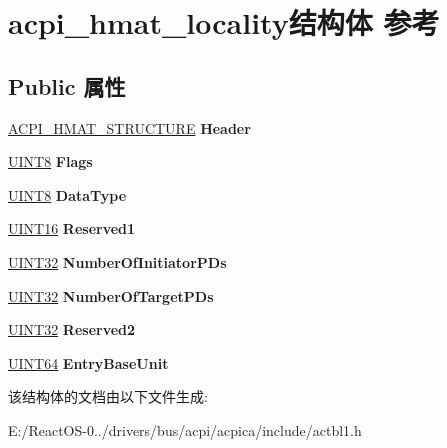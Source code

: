 \hypertarget{structacpi__hmat__locality}{}\section{acpi\+\_\+hmat\+\_\+locality结构体 参考}
\label{structacpi__hmat__locality}
\subsection*{Public 属性}
\begin{DoxyCompactItemize}
\item 
\mbox{\label{structacpi__hmat__locality_a05fea13a2133bc8eba3e2a5760065901}} 
\hyperlink{structacpi__hmat__structure}{A\+C\+P\+I\+\_\+\+H\+M\+A\+T\+\_\+\+S\+T\+R\+U\+C\+T\+U\+RE} {\bfseries Header}
\item 
\mbox{\label{structacpi__hmat__locality_a62192b0485e4403e5d60ae7096cd00b6}} 
\hyperlink{_processor_bind_8h_ab27e9918b538ce9d8ca692479b375b6a}{U\+I\+N\+T8} {\bfseries Flags}
\item 
\mbox{\label{structacpi__hmat__locality_a9b3cee3e5febc042dbb3936f0e2ec4ec}} 
\hyperlink{_processor_bind_8h_ab27e9918b538ce9d8ca692479b375b6a}{U\+I\+N\+T8} {\bfseries Data\+Type}
\item 
\mbox{\label{structacpi__hmat__locality_a67049ef2853c062cf5464a175e860432}} 
\hyperlink{_processor_bind_8h_a09f1a1fb2293e33483cc8d44aefb1eb1}{U\+I\+N\+T16} {\bfseries Reserved1}
\item 
\mbox{\label{structacpi__hmat__locality_aa335a2fb142a166d8ffe8fbe50ccc50c}} 
\hyperlink{_processor_bind_8h_ae1e6edbbc26d6fbc71a90190d0266018}{U\+I\+N\+T32} {\bfseries Number\+Of\+Initiator\+P\+Ds}
\item 
\mbox{\label{structacpi__hmat__locality_a233ad9fac9ca3fe446f4334514250e74}} 
\hyperlink{_processor_bind_8h_ae1e6edbbc26d6fbc71a90190d0266018}{U\+I\+N\+T32} {\bfseries Number\+Of\+Target\+P\+Ds}
\item 
\mbox{\label{structacpi__hmat__locality_a50bb04e9e9d3cb941cdc034b817338d2}} 
\hyperlink{_processor_bind_8h_ae1e6edbbc26d6fbc71a90190d0266018}{U\+I\+N\+T32} {\bfseries Reserved2}
\item 
\mbox{\label{structacpi__hmat__locality_a34950ddb0279da659622906e55cd8bc9}} 
\hyperlink{_processor_bind_8h_a57be03562867144161c1bfee95ca8f7c}{U\+I\+N\+T64} {\bfseries Entry\+Base\+Unit}
\end{DoxyCompactItemize}


该结构体的文档由以下文件生成\+:\begin{DoxyCompactItemize}
\item 
E\+:/\+React\+O\+S-\/0../drivers/bus/acpi/acpica/include/actbl1.\+h\end{DoxyCompactItemize}
